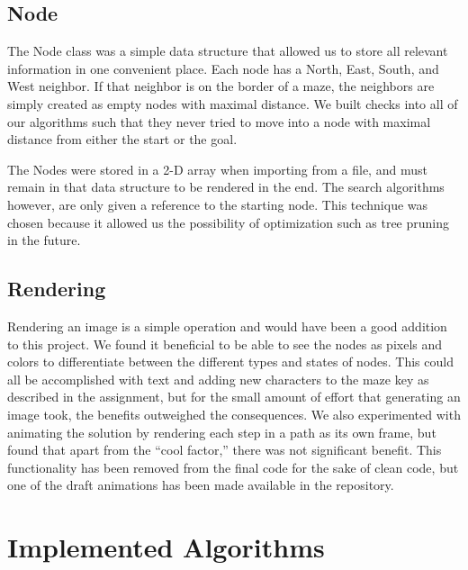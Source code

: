 \documentclass{article}
\begin{document}

\subsection{Node}
The Node class was a simple data structure that allowed us to store all relevant information in one convenient place. Each node has a North, East, South, and West neighbor. If that neighbor is on the border of a maze, the neighbors are simply created as empty nodes with maximal distance. We built checks into all of our algorithms such that they never tried to move into a node with maximal distance from either the start or the goal.

The Nodes were stored in a 2-D array when importing from a file, and must remain in that data structure to be rendered in the end. The search algorithms however, are only given a reference to the starting node. This technique was chosen because it allowed us the possibility of optimization such as tree pruning in the future.

\subsection{Rendering}
Rendering an image is a simple operation and would have been a good addition to this project. We found it beneficial to be able to see the nodes as pixels and colors to differentiate between the different types and states of nodes. This could all be accomplished with text and adding new characters to the maze key as described in the assignment, but for the small amount of effort that generating an image took, the benefits outweighed the consequences. We also experimented with animating the solution by rendering each step in a path as its own frame, but found that apart from the ``cool factor,'' there was not significant benefit. This functionality has been removed from the final code for the sake of clean code, but one of the draft animations has been made available in the repository.

\section{Implemented Algorithms}
\end{document}
